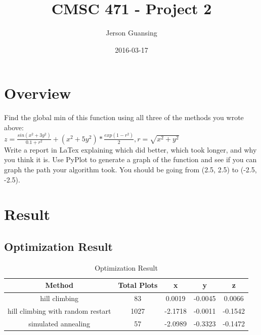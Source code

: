 \documentclass{article}
\title{CMSC 471 - Project 2}
\date{2016-03-17}
\author{Jerson Guansing}
\begin{document}
  \maketitle
  \newpage
  \tableofcontents
  \newpage

  \section{Overview}
  
  Find the global min of this function using all three of the methods you wrote above:\\
  
  $z = \frac{sin(x^2 + 3y^2)}{0.1 + r^2} + (x^2 + 5y^2) * \frac{exp(1 - r^2)}{2}, r = \sqrt{x^2 + y^2}$ \\
  
  Write a report in LaTex explaining which did better, which took longer, and why you think it is.  Use PyPlot to generate a graph of the function and see if you can graph the path your algorithm took.  You should be going from (2.5, 2.5) to (-2.5, -2.5).\\
  
  \section{Result}
  
   \subsection{Optimization Result}
  \begin{table}[h]
  	\centering
  	\caption{Optimization Result}
  	\label{tab:table1}
  	\begin{tabular}{|c|c|c|c|c|}
  	\hline
  	Method & Total Plots & x & y & z \\
  	\hline
  	hill climbing & 83 & 0.0019 & -0.0045 & 0.0066 \\
  	\hline
  	hill climbing with random restart & 1027 & -2.1718 & -0.0011 & -0.1542 \\
  	\hline
  	simulated annealing & 57 & -2.0989 & -0.3323 & -0.1472 \\
  	\hline
  \end{tabular}
  \end{table}
  
\end{document}
